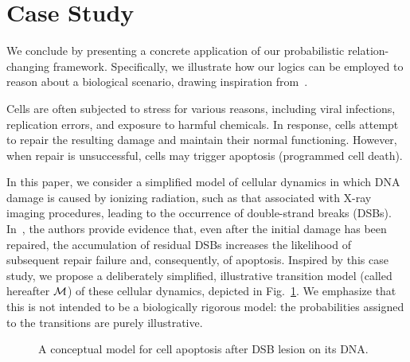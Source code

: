 \section{Case Study}
\label{sec:case}

We conclude by presenting a concrete application of our probabilistic relation-changing framework. Specifically, we illustrate how our logics can be employed to reason about a biological scenario, drawing inspiration from~\cite{ATHGM16}. 

Cells are often subjected to stress for various reasons, including viral infections, replication errors, and exposure to harmful chemicals. In response, cells attempt to repair the resulting damage and maintain their normal functioning. However, when repair is unsuccessful, cells may trigger apoptosis (programmed cell death).

In this paper, we consider a simplified model of cellular dynamics in which DNA damage is caused by ionizing radiation, such as that associated with X-ray imaging procedures, leading to the occurrence of double-strand breaks (DSBs). In~\cite{ATHGM16}, the authors provide evidence that, even after the initial damage has been repaired, the accumulation of residual DSBs increases the likelihood of subsequent repair failure and, consequently, of apoptosis. Inspired by this case study, we propose a deliberately simplified, illustrative transition model (called hereafter $\mathcal{M}$) of these cellular dynamics, depicted in Fig.~\ref{ex_apop}. We emphasize that this is not intended to be a biologically rigorous model: the probabilities assigned to the transitions are purely illustrative.

\begin{figure}
\centering
{}
\caption{A conceptual model for cell apoptosis after DSB lesion on its DNA.}
\label{ex_apop}
\end{figure}


